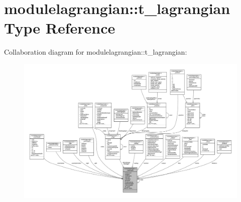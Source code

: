 \hypertarget{structmodulelagrangian_1_1t__lagrangian}{}\section{modulelagrangian\+:\+:t\+\_\+lagrangian Type Reference}
\label{structmodulelagrangian_1_1t__lagrangian}


Collaboration diagram for modulelagrangian\+:\+:t\+\_\+lagrangian\+:\nopagebreak
\begin{figure}[H]
\begin{center}
\leavevmode
\includegraphics[width=350pt]{structmodulelagrangian_1_1t__lagrangian__coll__graph}
\end{center}
\end{figure}
